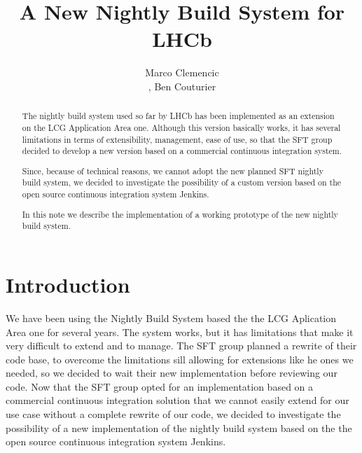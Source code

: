 \documentclass{lhcbnote}
\title{A New Nightly Build System for LHCb}
\author{Marco Clemencic\address[CERN]{CERN, Switzerland},
        Ben Couturier\addressmark[CERN]}
\begin{document}
\maketitle

\begin{abstract}
The nightly build system used so far by LHCb has been implemented as an
extension on the LCG Application Area one\cite{Kruzelecki:2010zz}.  Although
this version basically works, it has several limitations in terms of
extensibility, management, ease of use, so that the SFT group decided to develop
a new version based on a commercial continuous integration system.

Since, because of technical reasons, we cannot adopt the new planned SFT nightly
build system, we decided to investigate the possibility of a custom version
based on the open source continuous integration system Jenkins\cite{Jenkins}.

In this note we describe the implementation of a working prototype of the new
nightly build system.
\end{abstract}

\begin{status}
\end{status}

\tableofcontents

\listoffigures

\section{Introduction}
We have been using the Nightly Build System based the the LCG Aplication Area
one for several years\cite{Kruzelecki:2010zz}.  The system works, but it has
limitations that make it very difficult to extend and to manage.  The SFT group
planned a rewrite of their code base, to overcome the limitations sill allowing
for extensions like he ones we needed, so we decided to wait their new
implementation before reviewing our code.  Now that the SFT group opted for an
implementation based on a commercial continuous integration solution that we
cannot easily extend for our use case without a complete rewrite of our code, we
decided to investigate the possibility of a new implementation of the nightly
build system based on the the open source continuous integration system
Jenkins\cite{Jenkins}.
\end{document}
